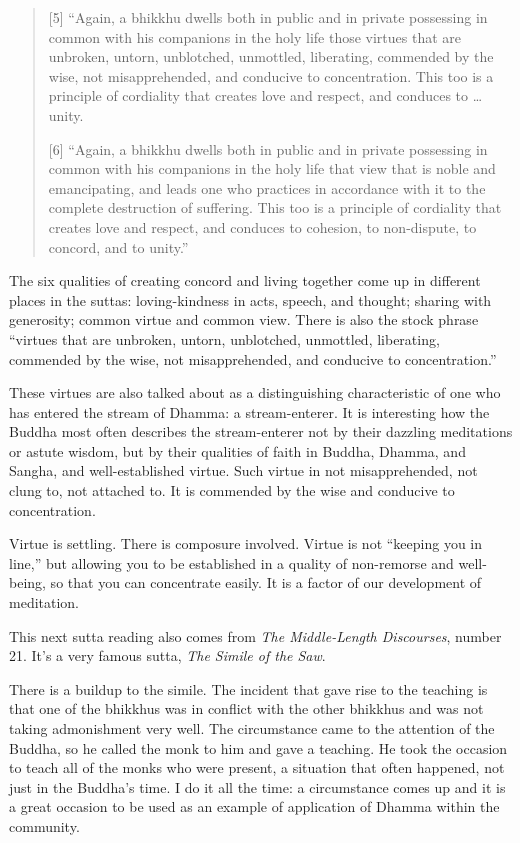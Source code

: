 \begin{quotation}
{[}5{]} “Again, a bhikkhu dwells both in public and in private
possessing in common with his companions in the holy life those virtues
that are unbroken, untorn, unblotched, unmottled, liberating, commended
by the wise, not misapprehended, and conducive to concentration. This
too is a principle of cordiality that creates love and respect, and
conduces to \ldots{} unity.

{[}6{]} “Again, a bhikkhu dwells both in public and in private
possessing in common with his companions in the holy life that view that
is noble and emancipating, and leads one who practices in accordance
with it to the complete destruction of suffering. This too is a
principle of cordiality that creates love and respect, and conduces to
cohesion, to non-dispute, to concord, and to unity.”
\end{quotation}

The six qualities of creating concord and living together come up in
different places in the suttas: loving-kindness in acts, speech, and
thought; sharing with generosity; common virtue and common view. There
is also the stock phrase “virtues that are unbroken, untorn, unblotched,
unmottled, liberating, commended by the wise, not misapprehended, and
conducive to concentration.”

These virtues are also talked about as a distinguishing characteristic
of one who has entered the stream of Dhamma: a stream-enterer. It is
interesting how the Buddha most often describes the stream-enterer not
by their dazzling meditations or astute wisdom, but by their qualities
of faith in Buddha, Dhamma, and Sangha, and well-established virtue.
Such virtue in not misapprehended, not clung to, not attached to. It is
commended by the wise and conducive to concentration.

Virtue is settling. There is composure involved. Virtue is not “keeping
you in line,” but allowing you to be established in a quality of
non-remorse and well-being, so that you can concentrate easily. It is a
factor of our development of meditation.

This next sutta reading also comes from \emph{The Middle-Length
Discourses}, number 21. It’s a very famous sutta, \emph{The Simile of
the Saw}.

There is a buildup to the simile. The incident that gave rise to the
teaching is that one of the bhikkhus was in conflict with the other
bhikkhus and was not taking admonishment very well. The circumstance
came to the attention of the Buddha, so he called the monk to him and
gave a teaching. He took the occasion to teach all of the monks who were
present, a situation that often happened, not just in the Buddha’s time.
I do it all the time: a circumstance comes up and it is a great occasion
to be used as an example of application of Dhamma within the community.

